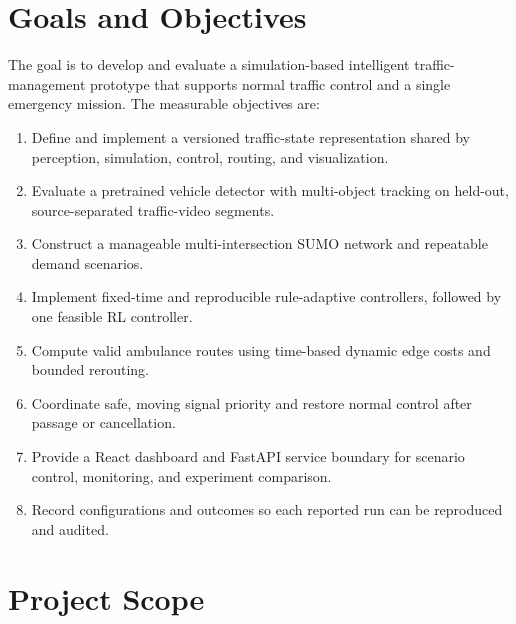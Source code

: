 \section{Goals and Objectives}

The goal is to develop and evaluate a simulation-based intelligent traffic-management prototype that supports normal traffic control and a single emergency mission. The measurable objectives are:

\begin{enumerate}[label=O\arabic*.]
\item Define and implement a versioned traffic-state representation shared by perception, simulation, control, routing, and visualization.
\item Evaluate a pretrained vehicle detector with multi-object tracking on held-out, source-separated traffic-video segments.
\item Construct a manageable multi-intersection SUMO network and repeatable demand scenarios.
\item Implement fixed-time and reproducible rule-adaptive controllers, followed by one feasible RL controller.
\item Compute valid ambulance routes using time-based dynamic edge costs and bounded rerouting.
\item Coordinate safe, moving signal priority and restore normal control after passage or cancellation.
\item Provide a React dashboard and FastAPI service boundary for scenario control, monitoring, and experiment comparison.
\item Record configurations and outcomes so each reported run can be reproduced and audited.
\end{enumerate}

\section{Project Scope}

